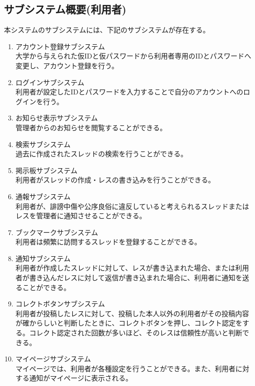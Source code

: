 \documentclass[a4j]{jarticle}
\begin{document}
\subsection{サブシステム概要(利用者)}
本システムのサブシステムには、下記のサブシステムが存在する。
\begin{enumerate}
\item アカウント登録サブシステム\\
大学から与えられた仮IDと仮パスワードから利用者専用のIDとパスワードへ変更し、アカウント登録を行う。

\item ログインサブシステム\\
利用者が設定したIDとパスワードを入力することで自分のアカウントへのログインを行う。

\item お知らせ表示サブシステム\\
管理者からのお知らせを閲覧することができる。

\item 検索サブシステム\\
過去に作成されたスレッドの検索を行うことができる。


\item 掲示板サブシステム\\
利用者がスレッドの作成・レスの書き込みを行うことができる。


\item 通報サブシステム\\
利用者が、誹謗中傷や公序良俗に違反していると考えられるスレッドまたはレスを管理者に通知させることができる。


\item ブックマークサブシステム\\
利用者は頻繁に訪問するスレッドを登録することができる。


\item 通知サブシステム\\
利用者が作成したスレッドに対して、レスが書き込まれた場合、または利用者が書き込んだレスに対して返信が書き込まれた場合に、利用者に通知を送ることができる。


\item コレクトボタンサブシステム\\
利用者が投稿したレスに対して、投稿した本人以外の利用者がその投稿内容が確からしいと判断したときに、コレクトボタンを押し、コレクト認定をする。コレクト認定された回数が多いほど、そのレスは信頼性が高いと判断できる。


\item マイページサブシステム\\
マイページでは、利用者が各種設定を行うことができる。また、利用者に対する通知がマイページに表示される。
\end{enumerate}
\end{document}
